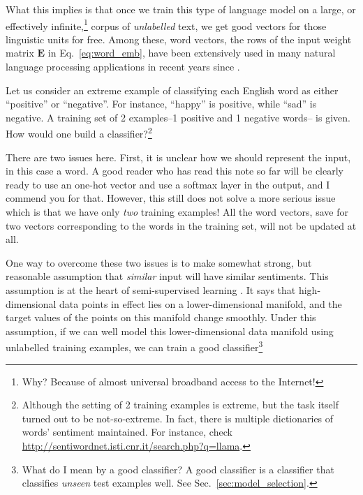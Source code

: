 \documentclass{report}
\newcommand{\matr}[1]{\mathbf{#1}}
\newcommand{\mE}[0]{\matr{E}}
\begin{document}
What this implies is that once we train this type of language model on a large,
or effectively infinite,\footnote{
    Why? Because of almost universal broadband access to the Internet!
}
corpus of {\em unlabelled} text, we get good vectors for those linguistic units
for free. Among these, word vectors, the rows of the input weight matrix $\mE$
in Eq.~\eqref{eq:word_emb}, have been extensively used in many natural language
processing applications in recent years since
\cite{turian2010word,collobert2011natural,mikolov2013efficient}.

Let us consider an extreme example of classifying each English word as either
``positive'' or ``negative''. For instance, ``happy'' is positive, while ``sad''
is negative. A training set of 2 examples--1 positive and 1 negative words-- is
given. How would one build a classifier?\footnote{
    Although the setting of 2 training examples is extreme, but the task itself
    turned out to be not-so-extreme. In fact, there is multiple dictionaries of
    words' sentiment maintained. For instance, check
    \url{http://sentiwordnet.isti.cnr.it/search.php?q=llama}.
}

There are two issues here. First, it is unclear how we should represent the
input, in this case a word. A good reader who has read this note so far will be
clearly ready to use an one-hot vector and use a softmax layer in the output,
and I commend you for that. However, this still does not solve a more serious
issue which is that we have only {\em two} training examples!  All the word
vectors, save for two vectors corresponding to the words in the training set,
will not be updated at all.

One way to overcome these two issues is to make somewhat strong, but reasonable
assumption that {\em similar} input will have similar sentiments. This
assumption is at the heart of semi-supervised learning \citep{Chapelle2006}. It
says that high-dimensional data points in effect lies on a lower-dimensional
manifold, and the target values of the points on this manifold change smoothly.
Under this assumption, if we can well model this lower-dimensional data manifold
using unlabelled training examples, we can train a good classifier\footnote{
    What do I mean by a good classifier? A good classifier is a classifier that
    classifies {\em unseen} test examples well. See
    Sec.~\ref{sec:model_selection}.
} 
\end{document}
